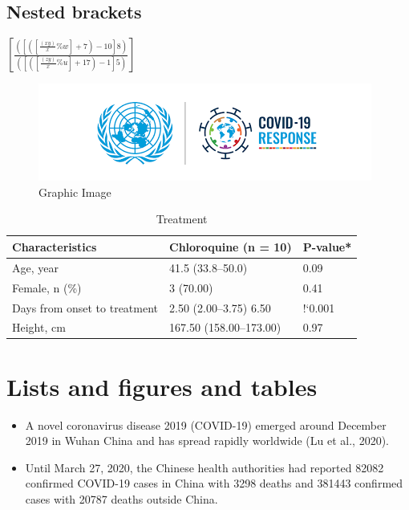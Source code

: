 \documentclass{article}
\begin{document}
\subsection{Nested brackets}
\delimitershortfall=-1pt %
$\left[
\frac
{\left(\left[\left(\left[\frac{(xy)}{x}\%w\right]+7\right)-10\right]8\right)}
{\left(\left[\left(\left[\frac{(zy)}{x}\%u\right]+17\right)-1\right]5\right)}
\right]
$
\newpage
\begin{figure}
    \centering
    \includegraphics[width=\linewidth]{covid.png}
    \caption{Graphic Image}
    \label{fig:logo}
\end{figure}
\begin{table} 
\begin{tabular}{|l|l|l|}
     \hline
     Characteristics & Chloroquine (n = 10) & P-value* \\
     \hline
     \hline
     Age, year & 41.5 (33.8--50.0) & 0.09 \\
     \hline
     Female, n (\%) & 3 (70.00) & 0.41 \\
     \hline
     Days from onset to treatment & 2.50 (2.00--3.75) 6.50 & !`0.001 \\
     \hline
     Height, cm & 167.50 (158.00--173.00) & 0.97 \\
     \hline
\end{tabular}
\caption{Treatment}
\label{table:1}
\end{table}

\section{Lists and figures and tables}
\label{section-2-figsandtabs}
\begin{itemize} %
    \item A novel coronavirus disease 2019 (COVID-19) emerged around December 2019 in Wuhan China and has spread rapidly worldwide (Lu et al., 2020).
    \item Until March 27, 2020, the Chinese health authorities had reported 82082 confirmed COVID-19 cases in China with 3298 deaths and 381443 confirmed cases with 20787 deaths outside China.
\end{itemize}
\end{document}
